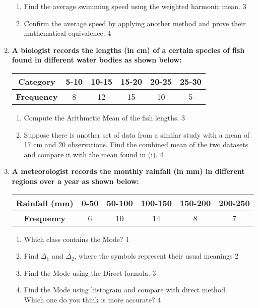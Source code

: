 \documentclass[a4paper,oneside]{book}
\begin{document}
\begin{enumerate}
\begin{enumerate}
    \item  
    Find the average swimming speed using the weighted harmonic mean. \hfill 3
    \item
    Confirm the average speed by applying another method and prove their 
    mathematical equivalence. \hfill 4
\end{enumerate}

\item
\textbf{A biologist records the lengths (in cm) of a certain species of 
fish found in different water bodies as shown below:}

\begin{table}[h]
\centering
\begin{tabular}{c|c|c|c|c|c}
\textbf{Category} & 5-10 & 10-15 & 15-20 & 20-25 & 25-30 \\ \hline
\textbf{Frequency} & 8    & 12    & 15    & 10    & 5     
\end{tabular}
\end{table}

\begin{enumerate}
    \item  
    Compute the Arithmetic Mean of the fish lengths. \hfill 3
    \item
    Suppose there is another set of data from a similar study with a mean of 17 cm and 20 observations. Find the combined mean of the two datasets and compare it with the mean found in (i). \hfill 4
\end{enumerate}

 \item
	  \textbf{A meteorologist records the monthly rainfall (in mm) in different regions over a year as shown below:}

\begin{table}[h]
\centering
\begin{tabular}{c|c|c|c|c|c}
\textbf{Rainfall (mm)} & 0-50 & 50-100 & 100-150 & 150-200 & 200-250 \\ \hline
\textbf{Frequency}     & 6    & 10     & 14      & 8       & 7       
\end{tabular}
\end{table}

  
  \begin{enumerate}
    \item
	Which class contains the Mode? \hfill 1
    \item
	Find $\Delta_1$ and $\Delta_2$, where the symbols represent their usual meanings \hfill 2
    \item  
	Find the Mode using the Direct formula. \hfill 3
    \item
	Find the Mode using histogram and compare with direct method. \\ Which one do you think is more accurate? \hfill 4
  \end{enumerate}
  

\end{enumerate}
\end{document}
